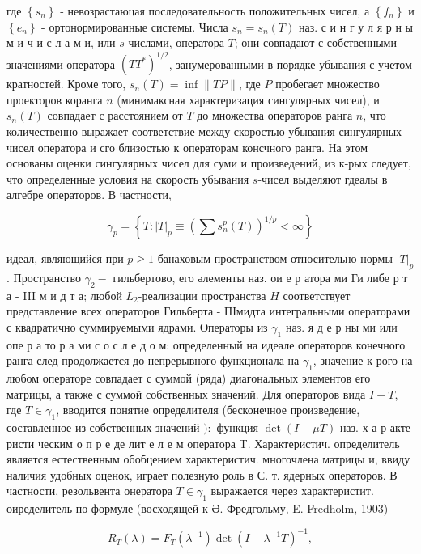 \documentclass[10pt]{article}
\begin{document}
где $\left\{s_{n}\right\}$ - невозрастаюцая последовательность положительных чисел, а $\left\{f_{n}\right\}$ и $\left\{e_{n}\right\}$ - ортонормированные системы. Числа $s_{n}=s_{n}(T)$ наз. с и н г у л я р н ы м и ч и с л а м и, или $s$-числами, оператора $T$; они совпадают с собственными значениями оператора $\left(T T^{*}\right)^{1 / 2}$, занумерованными в порядке убывания с учетом кратностей. Кроме того, $s_{n}(T)=\inf \|T P\|$, где $P$ пробегает множество проекторов коранга $n$ (минимаксная характеризация сингулярных чисел), и $s_{n}(T)$ совпадает с расстоянием от $T$ до множества операторов ранга $n$, что количественно выражает соответствие между скоростью убывания сингулярных чисел оператора и сго близостью к операторам консчного ранга. На этом основаны оценки сингулярных чисел для суми и произведений, из к-рых следует, что определенные условия на скорость убывания $s$-чисел выделяют гдеалы в алгебре операторов. В частности,



\[

\gamma_{p}=\left\{T:|T|_{p} \equiv\left(\sum s_{n}^{p}(T)\right)^{1 / p}<\infty\right\}

\]



идеал, являющийся при $p \geqslant 1$ банаховым пространством относительно нормы $|T|_{p}$. Пространство $\gamma_{2}-$ гильбертово, его әлементы наз. ои е р атора ми Ги либе р т а - III м и д т а; любой $L_{2}$-реализации пространства $H$ соответствует представление всех операторов Гильберта - ПІмидта интегральными операторами с квадратично суммируемыми ядрами. Операторы из $\gamma_{1}$ наз. я д е р ны ми или опе р а то р а ми с о с л е д о м: определенный на идеале операторов конечного ранга след продолжается до непрерывного функционала на $\gamma_{1}$, значение к-рого на любом операторе совпадает с суммой (ряда) диагональных элементов его матрицы, а также с суммой собственных значений. Для операторов вида $I+T$, где $T \in \gamma_{1}$, вводится понятие определителя (бесконечное произведение, составленное из собственных значений $):$ функция $\operatorname{det}(I-\mu T)$ наз. х а р акте ристи ческим $о$ п р е де лит е л е м оператора T. Характеристич. определитель является естественным обобцением характеристич. многочлена матрицы и, ввиду наличия удобных оценок, играет полезную роль в С. т. ядерных операторов. В частности, резольвента онератора $T \in \gamma_{1}$ выражается через характеристит. оиределитель по формуле (восходящей к Ә. Фредгольму, E. Fredholm, 1903)



\[

R_{T}(\lambda)=F_{T}\left(\lambda^{-1}\right) \operatorname{det}\left(I-\lambda^{-1} T\right)^{-1},

\]
\end{document}
